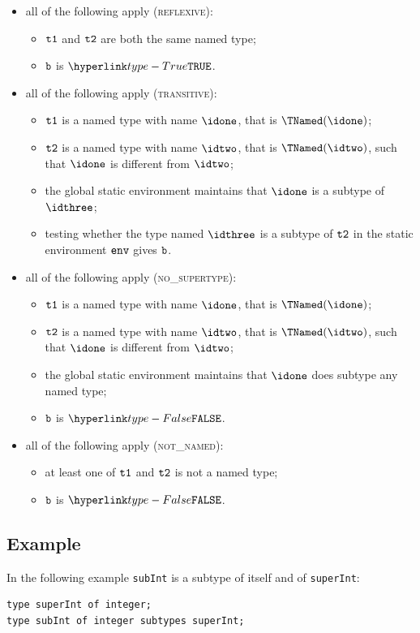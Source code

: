 \documentclass{book}
\begin{document}
\begin{itemize}
  \item all of the following apply (\textsc{reflexive}):
  \begin{itemize}
    \item $\texttt{t1}$ and $\texttt{t2}$ are both the same named type;
    \item $\texttt{b}$ is $\True$.
  \end{itemize}

  \item all of the following apply (\textsc{transitive}):
  \begin{itemize}
    \item $\texttt{t1}$ is a named type with name $\idone$, that is $\TNamed(\idone)$;
    \item $\texttt{t2}$ is a named type with name $\idtwo$, that is $\TNamed(\idtwo)$, such that $\idone$ is different from $\idtwo$;
    \item the global static environment maintains that $\idone$ is a subtype of $\idthree$;
    \item testing whether the type named $\idthree$ is a subtype of $\texttt{t2}$ in the static environment $\texttt{env}$
    gives $\texttt{b}$.
  \end{itemize}

  \item all of the following apply (\textsc{no\_supertype}):
  \begin{itemize}
    \item $\texttt{t1}$ is a named type with name $\idone$, that is $\TNamed(\idone)$;
    \item $\texttt{t2}$ is a named type with name $\idtwo$, that is $\TNamed(\idtwo)$, such that $\idone$ is different from $\idtwo$;
    \item the global static environment maintains that $\idone$ does subtype any named type;
    \item $\texttt{b}$ is $\False$.
  \end{itemize}

  \item all of the following apply (\textsc{not\_named}):
  \begin{itemize}
    \item at least one of $\texttt{t1}$ and $\texttt{t2}$ is not a named type;
    \item $\texttt{b}$ is $\False$.
  \end{itemize}
\end{itemize}
\subsection{Example}
In the following example \texttt{subInt} is a subtype of itself and of \texttt{superInt}:
\begin{verbatim}
type superInt of integer;
type subInt of integer subtypes superInt;
\end{verbatim}
\end{document}

